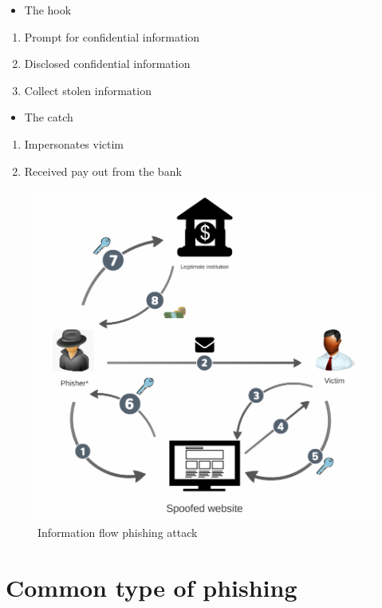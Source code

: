 \begin{itemize}
\item The hook \end{itemize}
\begin{enumerate}[resume]
\item Prompt for confidential information
\item Disclosed confidential information 
\item Collect stolen information \end{enumerate}
\begin{itemize}
\item The catch\end{itemize}
\begin{enumerate}[resume]
\item Impersonates victim 
\item Received pay out from the bank 
\end{enumerate}
\begin{figure}
\centering{}\includegraphics[scale=0.3]{gfx/info-flow-nolie}\protect\caption{\label{fig:Information-flow-phishing}Information flow phishing attack}
\end{figure}



\section{Common type of phishing}

